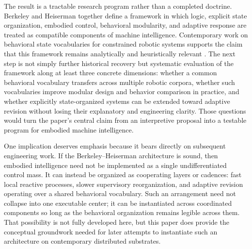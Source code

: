 \documentclass[11pt]{article}
\begin{document}
The result is a tractable research program rather than a completed doctrine. Berkeley and
Heiserman together define a framework in which logic, explicit state organization, embodied
control, behavioral modularity, and adaptive response are treated as compatible components of
machine intelligence. Contemporary work on behavioral state vocabularies for constrained robotic
systems supports the claim that this framework remains analytically and heuristically relevant
\citep{tucker2026behavioral}. The next step is not simply further historical recovery but systematic
evaluation of the framework along at least three concrete dimensions: whether a common behavioral
vocabulary transfers across multiple robotic corpora, whether such vocabularies improve modular
design and behavior comparison in practice, and whether explicitly state-organized systems can be
extended toward adaptive revision without losing their explanatory and engineering clarity. Those
questions would turn the paper's central claim from an interpretive proposal into a testable program
for embodied machine intelligence.

One implication deserves emphasis because it bears directly on subsequent engineering work. If the
Berkeley--Heiserman architecture is sound, then embodied intelligence need not be implemented as a
single undifferentiated control mass. It can instead be organized as cooperating layers or cadences:
fast local reactive processes, slower supervisory reorganization, and adaptive revision operating
over a shared behavioral vocabulary. Such an arrangement need not collapse into one executable
center; it can be instantiated across coordinated components so long as the behavioral organization
remains legible across them. That possibility is not fully developed here, but this paper does
provide the conceptual groundwork needed for later attempts to instantiate such an architecture on
contemporary distributed substrates.



\end{document}
